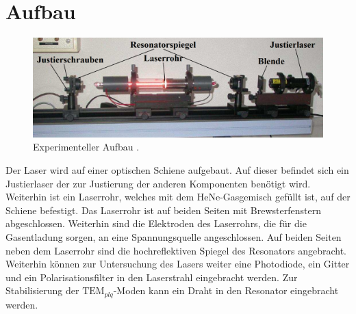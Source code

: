 \section{Aufbau}
\label{sec:Aufbau}
\begin{figure}
	\centering
	\includegraphics[width=\linewidth-100pt,height=\textheight-100pt,keepaspectratio]{content/Images/aufbau.png}
	\caption{Experimenteller Aufbau \cite{V61}.}
	\label{fig:Aufbau}
\end{figure}

Der Laser wird auf einer optischen Schiene aufgebaut. Auf dieser befindet sich ein Justierlaser der zur Justierung der anderen Komponenten benötigt wird. Weiterhin ist ein Laserrohr, welches mit dem HeNe-Gasgemisch gefüllt ist, auf der Schiene befestigt. Das Laserrohr ist auf beiden Seiten mit Brewsterfenstern abgeschlossen. Weiterhin sind die Elektroden des Laserrohrs, die für die Gasentladung sorgen, an eine Spannungsquelle angeschlossen. Auf beiden Seiten neben dem Laserrohr sind die hochreflektiven Spiegel des Resonators angebracht. Weiterhin können zur Untersuchung des Lasers weiter eine Photodiode, ein Gitter und ein Polarisationsfilter in den Laserstrahl eingebracht werden. Zur Stabilisierung der  $\text{TEM}_{plq}$-Moden kann ein Draht in den Resonator eingebracht werden.